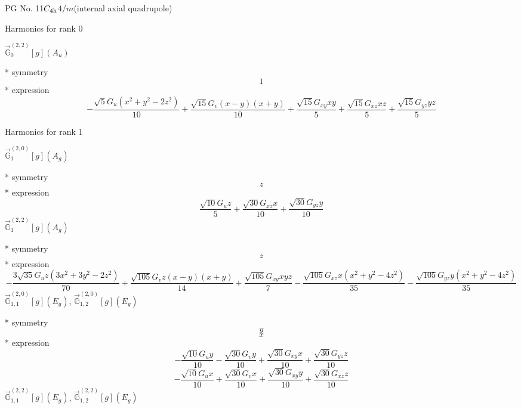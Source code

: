 \documentclass[fleqn,8pt]{jsarticle}
\begin{document}
\setcounter{MaxMatrixCols}{32}

\renewcommand{\tablename}{Table~}
\renewcommand{\figurename}{Figure~}
\begin{center}
\LARGE
PG No. 11\quad$C_{\rm 4h}$\quad$4/m$\quad[ tetragonal ] (internal axial quadrupole)
\end{center}

\noindent * Harmonics for rank 0

\noindent\quad $\vec{\mathbb{G}}_{0}^{(2,2)}[g](A_{u})$

\noindent\quad ** symmetry
\begin{dmath*}
1
\end{dmath*}
\noindent\quad ** expression
\begin{dmath*}
- \frac{\sqrt{5} G_{u} \left(x^{2} + y^{2} - 2 z^{2}\right)}{10} + \frac{\sqrt{15} G_{v} \left(x - y\right) \left(x + y\right)}{10} + \frac{\sqrt{15} G_{xy} x y}{5} + \frac{\sqrt{15} G_{xz} x z}{5} + \frac{\sqrt{15} G_{yz} y z}{5}
\end{dmath*}

\noindent * Harmonics for rank 1

\noindent\quad $\vec{\mathbb{G}}_{1}^{(2,0)}[g](A_{g})$

\noindent\quad ** symmetry
\begin{dmath*}
z
\end{dmath*}
\noindent\quad ** expression
\begin{dmath*}
\frac{\sqrt{10} G_{u} z}{5} + \frac{\sqrt{30} G_{xz} x}{10} + \frac{\sqrt{30} G_{yz} y}{10}
\end{dmath*}
\noindent\quad $\vec{\mathbb{G}}_{1}^{(2,2)}[g](A_{g})$

\noindent\quad ** symmetry
\begin{dmath*}
z
\end{dmath*}
\noindent\quad ** expression
\begin{dmath*}
- \frac{3 \sqrt{35} G_{u} z \left(3 x^{2} + 3 y^{2} - 2 z^{2}\right)}{70} + \frac{\sqrt{105} G_{v} z \left(x - y\right) \left(x + y\right)}{14} + \frac{\sqrt{105} G_{xy} x y z}{7} - \frac{\sqrt{105} G_{xz} x \left(x^{2} + y^{2} - 4 z^{2}\right)}{35} - \frac{\sqrt{105} G_{yz} y \left(x^{2} + y^{2} - 4 z^{2}\right)}{35}
\end{dmath*}
\noindent\quad $\vec{\mathbb{G}}_{1,1}^{(2,0)}[g](E_{g})$, $\vec{\mathbb{G}}_{1,2}^{(2,0)}[g](E_{g})$

\noindent\quad ** symmetry
\begin{dmath*}
y
\end{dmath*}
\begin{dmath*}
x
\end{dmath*}
\noindent\quad ** expression
\begin{dmath*}
- \frac{\sqrt{10} G_{u} y}{10} - \frac{\sqrt{30} G_{v} y}{10} + \frac{\sqrt{30} G_{xy} x}{10} + \frac{\sqrt{30} G_{yz} z}{10}
\end{dmath*}
\begin{dmath*}
- \frac{\sqrt{10} G_{u} x}{10} + \frac{\sqrt{30} G_{v} x}{10} + \frac{\sqrt{30} G_{xy} y}{10} + \frac{\sqrt{30} G_{xz} z}{10}
\end{dmath*}
\noindent\quad $\vec{\mathbb{G}}_{1,1}^{(2,2)}[g](E_{g})$, $\vec{\mathbb{G}}_{1,2}^{(2,2)}[g](E_{g})$
\end{document}
